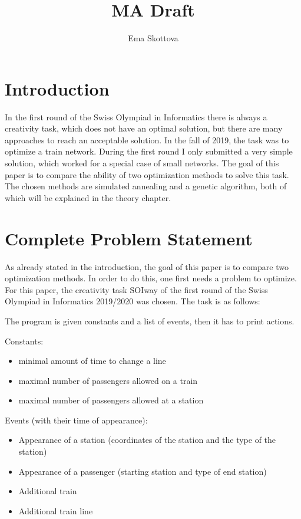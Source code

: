 \documentclass[10pt]{report}
\title{MA Draft}
\author{Ema Skottova}
\begin{document}
\maketitle

\tableofcontents

\chapter{Introduction}
In the first round of the Swiss Olympiad in Informatics there is always a creativity task, which does not have an optimal solution, but there are many approaches to reach an acceptable solution. In the fall of 2019, the task was to optimize a train network. During the first round I only submitted a very simple solution, which worked for a special case of small networks. The goal of this paper is to compare the ability of two optimization methods to solve this task. The chosen methods are simulated annealing and a genetic algorithm, both of which will be explained in the theory chapter.

\chapter{Complete Problem Statement}

As already stated in the introduction, the goal of this paper is to compare two optimization methods. In order to do this, one first needs a problem to optimize. For this paper, the creativity task SOIway of the first round of the Swiss Olympiad in Informatics 2019/2020 was chosen. The task is as follows:

The program is given constants and a list of events, then it has to print actions.

Constants:
\begin{itemize}
    \item minimal amount of time to change a line
    \item maximal number of passengers allowed on a train
    \item maximal number of passengers allowed at a station
\end{itemize}


Events (with their time of appearance):
\begin{itemize}
    \item Appearance of a station (coordinates of the station and the type of the station)
    \item Appearance of a passenger (starting station and type of end station)
    \item Additional train
    \item Additional train line
\end{itemize}
\end{document}

